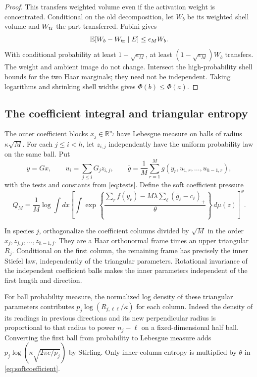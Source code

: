 \documentclass[11pt]{article}
\numberwithin{equation}{section}
\theoremstyle{definition}
\newcommand{\E}{\mathbb E}
\newcommand{\R}{\mathbb R}
\begin{document}
\begin{proof}
This transfers weighted volume even if the activation weight is concentrated. Conditional on the old decomposition, let $W_b$ be its weighted shell volume and $W_{\rm tr}$ the part transferred. Fubini gives
\[
\E[W_b-W_{\rm tr}\mid E]\le\epsilon_M W_b.
\]
With conditional probability at least $1-\sqrt{\epsilon_M}$, at least $(1-\sqrt{\epsilon_M})W_b$ transfers. The weight and ambient image do not change. Intersect the high-probability shell bounds for the two Haar marginals; they need not be independent. Taking logarithms and shrinking shell widths gives $\Phi(b)\le\Phi(a)$.
\end{proof}

\subsection{The coefficient integral and triangular entropy}
The outer coefficient blocks $x_j\in\R^{n_j}$ have Lebesgue measure on balls of radius $\kappa\sqrt M$. For each $j\le i<h$, let $z_{i,j}$ independently have the uniform probability law on the same ball. Put
\[
y=Gx,\qquad u_i=\sum_{j\le i}G_jz_{i,j},\qquad
\overline g=\frac1M\sum_{r=1}^M g(y_r,u_{1,r},\ldots,u_{h-1,r}),
\]
with the tests and constants from \eqref{eq:tests}. Define the soft coefficient pressure
\begin{equation}\label{eq:softcoefficient}
Q_M=\frac1M\log\int dx\left[
\int\exp\left\{\frac{\sum_rf(y_r)-M\lambda\sum_\ell(\bar g_\ell-c_\ell)_+}{\theta}\right\}\,d\mu(z)
\right]^\theta.
\end{equation}

In species $j$, orthogonalize the coefficient columns divided by $\sqrt M$ in the order $x_j,z_{j,j},\ldots,z_{h-1,j}$. They are a Haar orthonormal frame times an upper triangular $R_j$. Conditional on the first column, the remaining frame has precisely the inner Stiefel law, independently of the triangular parameters. Rotational invariance of the independent coefficient balls makes the inner parameters independent of the first length and direction.

For ball probability measure, the normalized log density of these triangular parameters contributes $p_j\log(R_{j,\ell\ell}/\kappa)$ for each column. Indeed the density of its readings in previous directions and its new perpendicular radius is proportional to that radius to power $n_j-\ell$ on a fixed-dimensional half ball. Converting the first ball from probability to Lebesgue measure adds
$p_j\log(\kappa\sqrt{2\pi e/p_j})$
by Stirling. Only inner-column entropy is multiplied by $\theta$ in \eqref{eq:softcoefficient}.
\end{document}
